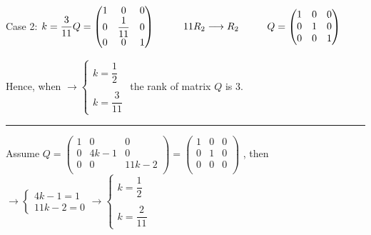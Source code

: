 \documentclass[fleqn]{article}
\begin{document}
\begin{enumerate}
      \bigbreak

      \textcolor{hwColor}{
        Case 2: 
        $
           k=\dfrac{3}{11}
           \\
           Q=\begin{pmatrix}
             1 & 0 & 0 \\
             0 & \dfrac{1}{11} & 0 \\
             0 & 0 & 1
           \end{pmatrix}
           \hspace{1cm} 11R_2 \longrightarrow R_2
           \hspace{1cm} Q=\begin{pmatrix}
            1 & 0 & 0 \\
            0 & 1 & 0 \\
            0 & 0 & 1
           \end{pmatrix}
        $
      }

      \textcolor{hwColor}{
          Hence, when 
        $
         \longrightarrow
         \begin{cases}
          k=\dfrac{1}{2} \\
          \\
          k= \dfrac{3}{11} 
         \end{cases}
        $
        the rank of matrix $Q$ is 3.
      }
      
      \textcolor{hwColor}{
        \rule{16cm}{0.4pt}
      }

      \bigbreak

      \textcolor{hwColor}{
        Assume
        $
          Q=\begin{pmatrix}
          1 & 0 & 0 \\
          0 & 4k-1 & 0 \\
          0 & 0 & 11k-2 \\
        \end{pmatrix}=\begin{pmatrix}
          1 & 0 & 0 \\
          0 & 1 & 0 \\
          0 & 0 & 0 \\
        \end{pmatrix}
        $
        , then 
        $
         \longrightarrow
         \begin{cases}
           4k-1=1 \\
           11k-2=0  
         \end{cases}
         \longrightarrow
         \begin{cases}
           k=\dfrac{1}{2} \\
           \\
           k= \dfrac{2}{11} 
         \end{cases}
        $
      }


\end{enumerate}
\end{document}
